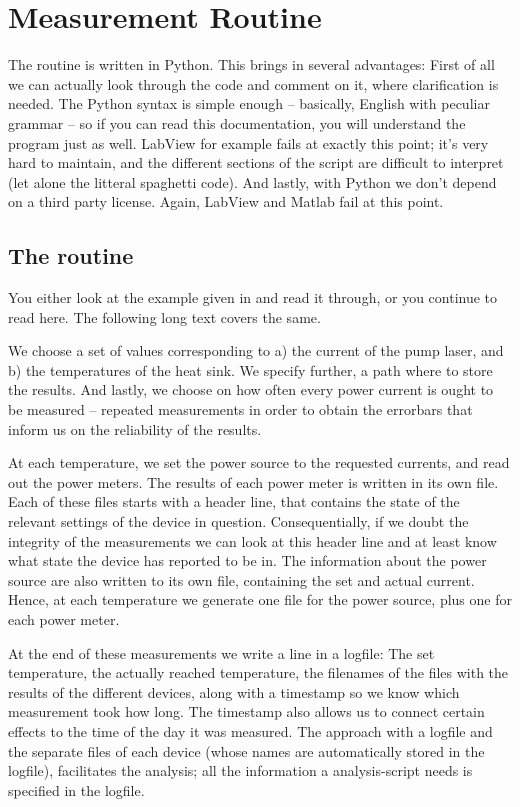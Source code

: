 \section{Measurement Routine}
\label{sec:routine}

The routine is written in Python.
This brings in several advantages:
First of all we can actually look through the code
and comment on it,
where clarification is needed.
The Python syntax is simple enough --
basically, English with peculiar grammar --
so if you can read this documentation,
you will understand the program just as well.
LabView for example
fails at exactly this point;
it's very hard to maintain,
and the different sections
of the script are difficult to interpret
(let alone the litteral spaghetti code).
And lastly,
with Python we don't depend on a third party license.
Again, LabView and Matlab
fail at this point.

\subsection{The routine}
\label{sec:routine:routine}

You either look at the example
given in 
and read it through,
or you continue to read here.
The following long text covers the same.

We choose a set of values corresponding to
a) the current of the pump laser,
and b) the temperatures of the heat sink.
We specify further, a path where to store the results.
And lastly, we choose on how often every power current
is ought to be measured --
repeated measurements in order to obtain
the errorbars
that inform us on the reliability of the results.

At each temperature,
we set the power source to the requested currents,
and read out the power meters.
The results of each power meter is written in its own file.
Each of these files starts with a header line,
that contains the state of the relevant settings of the device in question.
Consequentially,
if we doubt the integrity of the measurements
we can look at this header line and
at least know what state the device has reported to be in.
The information about the power source
are also written to its own file,
containing the set and actual current.
Hence, at each temperature we generate
one file for the power source, plus one for each power meter.

At the end of these measurements we write a line in a logfile:
The set temperature,
the actually reached temperature,
the filenames of the files
with the results of the different devices,
along with a timestamp so we know which measurement took how long.
The timestamp also allows us to connect certain effects
to the time of the day it was measured.
The approach with a logfile
and the separate files of each device
(whose names are automatically stored in the logfile),
facilitates the analysis;
all the information a analysis-script needs is specified in the logfile.

